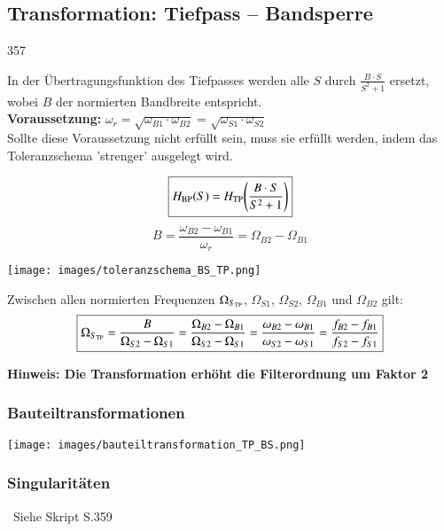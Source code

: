 \subsection{Transformation: Tiefpass -- Bandsperre}{357}

In der Übertragungsfunktion des Tiefpasses werden alle $S$ durch $\frac{B \cdot S}{S^2 + 1}$ ersetzt, wobei $B$ der normierten
Bandbreite entspricht. \\
\textbf{Voraussetzung:} $\omega_r = \sqrt{\omega_{B1} \cdot \omega_{B2}} = \sqrt{\omega_{S1} \cdot \omega_{S2} } $\\
Sollte diese Voraussetzung nicht erfüllt sein, muss sie erfüllt werden, indem das Toleranzschema 'strenger' ausgelegt wird.

\begin{minipage}[c]{0.4\columnwidth}
    $$ \boxed{H_{\rm BP}(S) = H_{\rm TP} \Bigg(\frac{B \cdot S}{S^2 + 1} \Bigg) } $$
    $$ \boxed{ B = \frac{\omega_{B2} - \omega_{B1}}{\omega_r} = \Omega_{B2} - \Omega_{B1} } $$
\end{minipage}
\hfill
\begin{minipage}[c]{0.58\columnwidth}
    \texttt{[image: images/toleranzschema\_BS\_TP.png]}
\end{minipage}

\vspace{0.2cm}
Zwischen allen normierten Frequenzen $\Omega_{S_{\rm TP}}$, $\Omega_{S1}$, $\Omega_{S2}$, $\Omega_{B1}$ und $\Omega_{B2}$ gilt:
$$ \boxed{ \Omega_{S_{\rm TP}} = \frac{B}{\Omega_{S2} - \Omega_{S1}} = \frac{\Omega_{B2} - \Omega_{B1}}{\Omega_{S2} - \Omega_{S1}}
    = \frac{\omega_{B2} - \omega_{B1}}{\omega_{S2} - \omega_{S1}} = \frac{f_{B2} - f_{B1}}{f_{S2} - f_{S1}} } $$

\textbf{Hinweis: Die Transformation erhöht die Filterordnung um Faktor 2}


\begin{minipage}[t]{0.48\columnwidth}
    \subsubsection{Bauteiltransformationen}
    \texttt{[image: images/bauteiltransformation\_TP\_BS.png]}
\end{minipage}
\hfill
\begin{minipage}[t]{0.48\columnwidth}
    \subsubsection{Singularitäten}

    \textrightarrow\ Siehe Skript S.359
\end{minipage}

